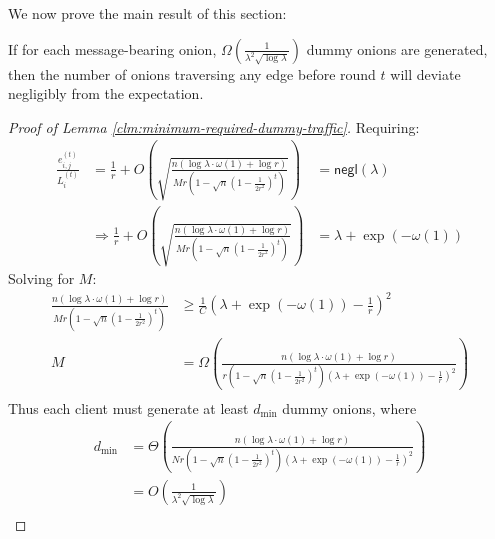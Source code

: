 We now prove the main result of this section:

\begin{theorem} \label{clm:minimum-required-dummy-traffic}
    If for each message-bearing onion, $\Omega\left(\frac{1}{\lambda^2 \sqrt{\log \lambda}}\right)$ dummy onions are generated, then the number of onions traversing any edge before round $t$ will deviate negligibly from the expectation.
\end{theorem}
\begin{proof}[Proof of Lemma \ref{clm:minimum-required-dummy-traffic}]
Requiring:
\begin{align*}
    \frac{e^{(t)}_{i,j}}{L^{(t)}_i} &= \frac{1}{r} + O\left(\sqrt{\frac{n(\log \lambda \cdot \omega(1) + \log r)}{Mr \left(1 - \sqrt{n} \left(1 - \frac{1}{2r^2}\right)^t\right)}}\right) &= \mathsf{negl}(\lambda)\\
    &\Rightarrow \frac{1}{r} + O\left(\sqrt{\frac{n(\log \lambda \cdot \omega(1) + \log r)}{Mr \left(1 - \sqrt{n} \left(1 - \frac{1}{2r^2}\right)^t\right)}}\right) &= \lambda + \exp(- \omega(1))
\end{align*}
Solving for $M$:
\begin{align*}
    \frac{n(\log \lambda \cdot \omega(1) + \log r)}{Mr \left(1 - \sqrt{n} \left(1 - \frac{1}{2r^2}\right)^t\right)} &\geq \frac{1}{C}\left(\lambda + \exp(- \omega(1)) - \frac{1}{r}\right)^2\\
    M &= \Omega\left(\frac{n(\log \lambda \cdot \omega(1) + \log r)}{r \left(1 - \sqrt{n} \left(1 - \frac{1}{2r^2}\right)^t\right)\left(\lambda + \exp(- \omega(1)) - \frac{1}{r}\right)^2}\right)\\
\end{align*}
Thus each client must generate at least $d_\text{min}$ dummy onions, where
\begin{align*}
    d_\text{min} &= \Theta\left(\frac{n(\log \lambda \cdot \omega(1) + \log r)}{Nr \left(1 - \sqrt{n} \left(1 - \frac{1}{2r^2}\right)^t\right)\left(\lambda + \exp(- \omega(1)) - \frac{1}{r}\right)^2}\right)\\
                 &= O\left(\frac{1}{\lambda^2 \sqrt{\log \lambda}}\right)\\

\end{align*}
\end{proof}
